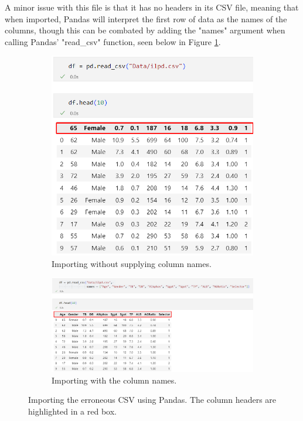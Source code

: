 \documentclass[12pt]{report}
\begin{document}
A minor issue with this file is that it has no headers in its CSV file, meaning that when imported, Pandas will interpret the first 
row of data as the names of the columns, though this can be combated by adding the "names" argument when calling Pandas' "read\_csv" function,
seen below in Figure \ref{fig:pandasNames}. 

\begin{figure}[H]
    \centering
    \begin{subfigure}{0.75\textwidth}
       \includegraphics[width=1\linewidth]{pandasNoNames.png}
       \caption{Importing without supplying column names.}
       \label{fig:pandasNames} 
    \end{subfigure}
    
    \begin{subfigure}{1\textwidth}
       \includegraphics[width=1\linewidth]{pandasNames.png}
       \caption{Importing with the column names.}
       \label{fig:PN2}
    \end{subfigure}
    \caption{Importing the erroneous CSV using Pandas. The column headers are highlighted in a red box.}
\end{figure}
\end{document}
